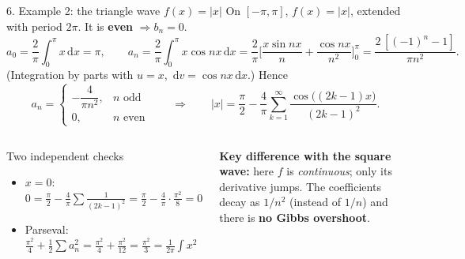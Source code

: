 \documentclass[aspectratio=169,10pt]{beamer}
\newcommand{\dd}{\,\mathrm{d}}
\begin{document}
\begin{frame}{6. Example 2: the triangle wave $f(x)=|x|$}
  \small
  On $[-\pi,\pi]$, $f(x)=|x|$, extended with period $2\pi$. It is \textbf{even} $\Rightarrow b_n=0$.
  \[
    a_0=\frac2\pi\int_0^\pi x\dd x=\pi,\qquad
    a_n=\frac2\pi\int_0^\pi x\cos nx\dd x=\frac2\pi\Big[\frac{x\sin nx}{n}+\frac{\cos nx}{n^2}\Big]_0^\pi=\frac{2\,[(-1)^n-1]}{\pi n^2}.
  \]
  (Integration by parts with $u=x$, $\dd v=\cos nx\dd x$.) Hence
  \[
    a_n=\begin{cases}-\dfrac{4}{\pi n^2},& n\text{ odd}\\[4pt]0,& n\text{ even}\end{cases}
    \qquad\Longrightarrow\qquad
    |x|=\frac\pi2-\frac4\pi\sum_{k=1}^{\infty}\frac{\cos\big((2k-1)x\big)}{(2k-1)^2}.
  \]
  \begin{columns}[T]
    \begin{keybox}{Two independent checks}
      \begin{itemize}\footnotesize
        \item $x=0$: $0=\frac\pi2-\frac4\pi\sum\frac1{(2k-1)^2}=\frac\pi2-\frac4\pi\cdot\frac{\pi^2}{8}=0$ \checkmark
        \item Parseval: $\frac{\pi^2}{4}+\frac12\sum a_n^2=\frac{\pi^2}{4}+\frac{\pi^2}{12}=\frac{\pi^2}{3}=\frac1{2\pi}\!\int x^2$ \checkmark
      \end{itemize}
    \end{keybox}
    \textbf{Key difference with the square wave:} here $f$ is \emph{continuous}; only its derivative jumps. The coefficients decay as $1/n^2$ (instead of $1/n$) and there is \textbf{no Gibbs overshoot}.
  \end{columns}
\end{frame}
\end{document}
